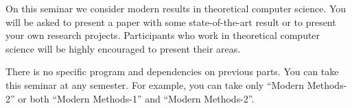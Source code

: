 On this seminar we consider modern results in theoretical computer science. You will be asked to present
a paper with some state-of-the-art result or to present your own research projects. Participants who work in
theoretical computer science will be highly encouraged to present their areas. 

There is no specific program and dependencies on previous parts. You can take this seminar at any
semester. For example, you can take only ``Modern Methods-2'' or both ``Modern Methods-1'' and ``Modern
Methods-2''.